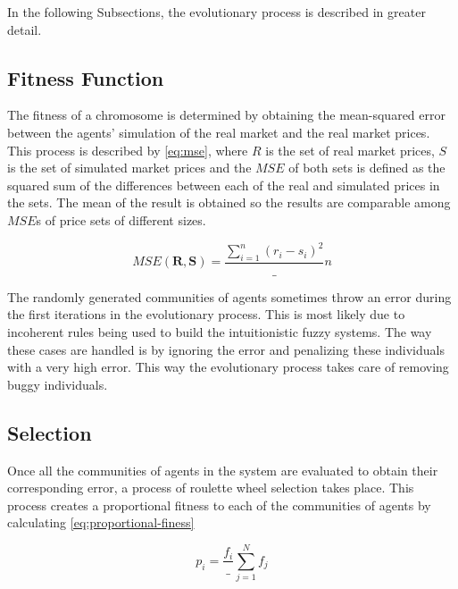 In the following Subsections, the evolutionary process is described in greater
detail.

\subsection{Fitness Function}
\label{subsection:fitness-function}

The fitness of a chromosome is determined by obtaining the mean-squared error
between the agents' simulation of the real market and the real market
prices. This process is described by \ref{eq:mse}, where $R$ is the set of real
market prices, $S$ is the set of simulated market prices and the $MSE$ of both
sets is defined as the squared sum of the differences between each of the real and
simulated prices in the sets. The mean of the result is obtained so the results
are comparable among $MSE$s of price sets of different sizes.

\begin{equation}
  \label{eq:mse}
  MSE(\bm{R}, \bm{S}) = \frac{\sum_{i=1}^{n}(r_i-s_i)^{2}}_{n}
\end{equation}

The randomly generated communities of agents sometimes throw an error during the
first iterations in the evolutionary process. This is most likely due to
incoherent rules being used to build the intuitionistic fuzzy systems. The way
these cases are handled is by ignoring the error and penalizing these
individuals with a very high error. This way the evolutionary process takes care
of removing buggy individuals. 

\subsection{Selection}
\label{subsection:selection}

Once all the communities of agents in the system are evaluated to obtain their
corresponding error, a process of roulette wheel selection takes place. This
process creates a proportional fitness to each of the communities of agents by
calculating \ref{eq:proportional-finess}

\begin{equation}
  \label{eq:proportional-fitness}
  p_i = \frac{f_i}_{\sum_{j=1}^{N} f_j}
\end{equation}

